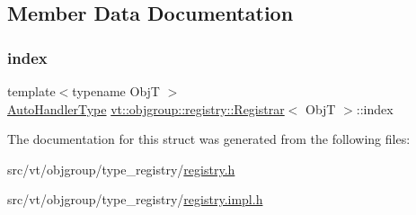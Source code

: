 \subsection{Member Data Documentation}
\mbox{\label{structvt_1_1objgroup_1_1registry_1_1_registrar_abd3c1a64c0c977d13878cfd389f73f0c}} 
\subsubsection{\texorpdfstring{index}{index}}
{\footnotesize\ttfamily template$<$typename ObjT $>$ \\
\hyperlink{namespacevt_1_1objgroup_1_1registry_ab61bb18a54c83c090d49a1a7f6f30037}{Auto\+Handler\+Type} \hyperlink{structvt_1_1objgroup_1_1registry_1_1_registrar}{vt\+::objgroup\+::registry\+::\+Registrar}$<$ ObjT $>$\+::index}



The documentation for this struct was generated from the following files\+:\begin{DoxyCompactItemize}
\item 
src/vt/objgroup/type\+\_\+registry/\hyperlink{objgroup_2type__registry_2registry_8h}{registry.\+h}\item 
src/vt/objgroup/type\+\_\+registry/\hyperlink{objgroup_2type__registry_2registry_8impl_8h}{registry.\+impl.\+h}\end{DoxyCompactItemize}
